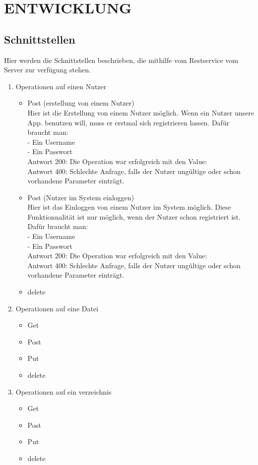 \section{\uppercase{Entwicklung}}
\subsection{Schnittstellen}
Hier werden die Schnittstellen beschrieben, die mithilfe vom Restservice vom Server zur verf\"ugung stehen.
\begin{enumerate}
\item Operationen auf einen Nutzer
	\begin{itemize}
	\item Post (erstellung von einem Nutzer) \\
Hier ist die Erstellung von einem Nutzer m\"oglich. Wenn ein Nutzer unsere App. benutzen will, muss er erstmal sich registrieren lassen. Daf\"ur braucht man: \\
	- Ein Username \\
	- Ein Passwort \\
Antwort 200: Die Operation war erfolgreich mit den Value: \\ 
Antwort 400: Schlechte Anfrage, falls der Nutzer ung\"ultige oder schon vorhandene Parameter eintr\"agt.  

	\item Post (Nutzer im System einloggen) \\
Hier ist das Einloggen von einem Nutzer im System möglich. Diese Funktionnalität ist nur möglich, wenn der Nutzer schon registriert ist. Daf\"ur braucht man: \\
	- Ein Username \\
	- Ein Passwort \\
Antwort 200: Die Operation war erfolgreich mit den Value: \\ 
Antwort 400: Schlechte Anfrage, falls der Nutzer ung\"ultige oder schon vorhandene Parameter eintr\"agt.  
	\item delete
	\end{itemize}

\item Operationen auf eine Datei
	\begin{itemize}
	\item Get
	\item Post
	\item Put
	\item delete
	\end{itemize}

\item Operationen auf ein verzeichnis
	\begin{itemize}
	\item Get
	\item Post
	\item Put
	\item delete
	\end{itemize}
\end{enumerate}